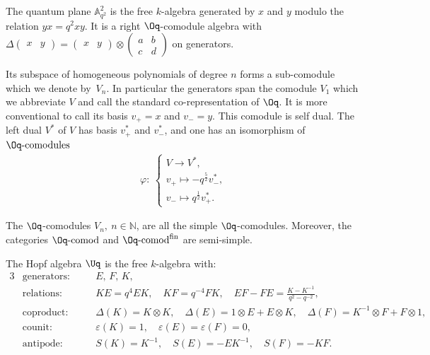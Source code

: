 \begin{Definition}\label{defOqcomods}
The quantum plane $\mathbb{A}_{q^2}^2$ is the free $k$-algebra generated by $x$ and $y$ modulo the relation $yx = q^2xy$. It is a right $\Oq$-comodule algebra with $\Delta \left(\begin{smallmatrix} x&y \end{smallmatrix}\right) = \left(\begin{smallmatrix} x&y \end{smallmatrix}\right) \otimes \left( \begin{smallmatrix} a & b \\ c & d \end{smallmatrix}\right)$ on generators.

Its subspace of homogeneous polynomials of degree $n$ forms a sub-comodule which we denote by~$V_n$.
In particular the generators span the comodule $V_1$ which we abbreviate $V$ and call the standard co-representation of $\Oq$. It is more conventional to call its basis $v_+ = x$ and $v_- = y$. This comodule is self dual. The left dual $V^*$ of $V$ has basis $v_+^*$ and $v_-^*$, and one has an isomorphism of $\Oq\text{-comodules}$
\begin{gather*}
\varphi \colon \
\begin{cases}
V \to V^*,
\\
v_+ \mapsto -q^{\frac{5}{2}} v_-^*,
\\[.5ex]
v_- \mapsto q^{\frac{1}{2}}v_+^*.
\end{cases}
\end{gather*}
\end{Definition}

{\sloppy\begin{Proposition}\label{propOqSemiSimple}
The $\Oq$-comodules $V_n,\ n \in \mathbb{N}$, are all the simple $\Oq$-comodules. Moreover, the categories $\Oq\text{-}{\rm comod}$ and $\Oq\text{-}{\rm comod}^{\rm fin}$ are semi-simple.
\end{Proposition}}

\begin{Definition}
The Hopf algebra $\Uq$ is the free $k$-algebra with:
\begin{alignat*}{3}
& \text{generators}\colon\quad  &&E,\,F,\,K,&
\\
&\text{relations}\colon && KE=q^4EK, \quad KF=q^{-4}FK,\quad  EF-FE = \frac{K-K^{-1}}{q^2-q^{-2}},&
\\
&\text{coproduct}\colon &&\Delta (K) = K \otimes K,\quad \Delta (E) = 1\otimes E+E\otimes K,\quad \Delta (F) = K^{-1}\otimes F + F\otimes 1,&
\\
& \text{counit}\colon && \varepsilon(K)=1,\quad\varepsilon(E)=\varepsilon(F)=0,&
\\
& \text{antipode}\colon && S(K) = K^{-1},\quad S(E) = -EK^{-1},\quad S(F) =-KF.&
\end{alignat*}
\end{Definition}

